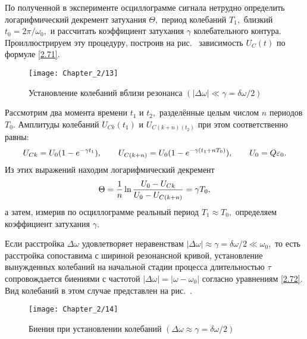 По полученной в эксперименте осциллограмме сигнала нетрудно определить логарифмический декремент затухания $\Theta,$ период колебаний $T_1,$ близкий $t_0=2\pi/\omega_0,$ и рассчитать коэффициент затухания $\gamma$ колебательного контура. Проиллюстрируем эту процедуру, построив на рис.~ зависимость $U_C(t)$ по формуле \eqref{2.71}.

\begin{figure}[h!]
	\centering\texttt{[image: Chapter\_2/13]}
	\caption{Установление колебаний вблизи резонанса $(|\Delta\omega|\ll\gamma=\delta\omega/2)$}
\end{figure}

Рассмотрим два момента времени $t_1$ и $t_2,$ разделённые целым числом $n$ периодов $T_0.$ Амплитуды колебаний $U_{Ck}(t_1)$ и $U_{C(k+n)(t_2)}$ при этом соответственно равны:
\begin{equation}\eqmark{2.74}
U_{Ck}=U_0(1-e^{-\gamma t_1}), \qquad U_{C(k+n)}=U_0(1-e^{-\gamma(t_1+nT_0)}), \qquad U_0=Q\varepsilon_0.
\end{equation}
Из этих выражений находим логарифмический декремент
\begin{equation}\eqmark{2.75}
\Theta=\dfrac{1}{n}\ln\dfrac{U_0-U_{Ck}}{U_0-U_{C(k+n)}}=\gamma T_0,
\end{equation}
а затем, измерив по осциллограмме реальный период $T_1\approx T_0,$ определяем коэффициент затухания $\gamma.$

Если расстройка $\Delta\omega$ удовлетворяет неравенствам $|\Delta\omega|\approx\gamma=\delta\omega/2\ll\omega_0,$ то есть расстройка сопоставима с шириной резонансной кривой, установление вынужденных колебаний на начальной стадии процесса длительностью $\tau$ сопровождается биениями с частотой $|\Delta\omega|=|\omega-\omega_0|$ согласно уравнениям \eqref{2.72}. Вид колебаний в этом случае представлен на рис.~.

\begin{figure}[h!]
	\centering\texttt{[image: Chapter\_2/14]}
	\caption{Биения при установлении колебаний $(\Delta\omega\approx\gamma=\delta\omega/2)$}
\end{figure}

